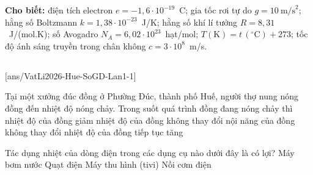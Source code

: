 \def\CheDo{solcolor}%
\def\tenchuong{Sở GD\&ĐT Huế -- Lần 1}
\def\thuonghieu{VẬT LÍ 12 -- Eduzy.com.vn}
\def\TachCauDS{1}
\def\TachCauLG{1}




	\noindent\textbf{Cho biết:} điện tích electron $e=-1{,}6\cdot 10^{-19}$~C; gia tốc rơi tự do $g=10~\text{m/s}^2$; hằng số Boltzmann $k=1{,}38\cdot 10^{-23}$~J/K; hằng số khí lí tưởng $R=8{,}31$~J/(mol.K); số Avogadro $N_A=6{,}02\cdot 10^{23}$~hạt/mol; $T(\text{K})=t\,(^\circ\text{C})+273$; tốc độ ánh sáng truyền trong chân không $c=3\cdot 10^8$~m/s.

	\noindent
	\subsection*{}
	\setcounter{ex}{0}
	[ans/VatLi2026-Hue-SoGD-Lan1-1]

	\begin{ex}%
		Tại một xưởng đúc đồng ở Phường Đúc, thành phố Huế, người thợ nung nóng đồng đến nhiệt độ nóng chảy. Trong suốt quá trình đồng đang nóng chảy thì
		\choice
		{nhiệt độ của đồng giảm}
		{\True nhiệt độ của đồng không thay đổi}
		{nội năng của đồng không thay đổi}
		{nhiệt độ của đồng tiếp tục tăng}
	\end{ex}

	\begin{ex}%
		Tác dụng nhiệt của dòng điện trong các dụng cụ nào dưới đây là có lợi?
		\choice
		{Máy bơm nước}
		{Quạt điện}
		{Máy thu hình (tivi)}
		{\True Nồi cơm điện}
	\end{ex}

